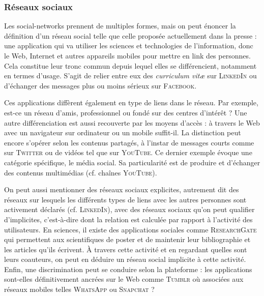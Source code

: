 \subsubsection[Réseaux sociaux]{Réseaux sociaux}
\label{subsub:II.1.1.2}

%
Les \glspl{social-network} prennent de multiples formes, mais on peut énoncer la définition d'un réseau social telle que celle proposée actuellement dans la presse : une application qui va utiliser les sciences et technologies de l'information, donc le Web, Internet et autres appareils mobiles pour mettre en \gls{link} des personnes. Cela constitue leur tronc commun depuis lequel elles se différencient, notamment en termes d'usage. 
S'agit de relier entre eux des \textit{curriculum vitæ} sur \textsc{LinkedIn} ou d'échanger des messages plus ou moins sérieux sur \textsc{Facebook}.

Ces applications diffèrent également en type de liens dans le réseau. Par exemple, est-ce un réseau d'amis, professionnel ou fondé sur des centres d'intérêt ? Une autre différenciation est aussi recouverte par les moyens d'accès : à travers le Web avec un navigateur sur ordinateur ou un mobile suffit-il. 
La distinction \nopagebreak peut encore s'opérer selon les contenus partagés, \pagebreak à l'instar de messages courts comme sur \textsc{Twitter} ou de vidéos tel que sur \textsc{YouTube}. Ce dernier exemple évoque une catégorie spécifique, le média social. Sa particularité est de produire et d'échanger des contenus multimédias (cf. chaînes \textsc{YouTube}).

%
On peut aussi mentionner des réseaux sociaux explicites, autrement dit des réseaux sur lesquels les différents types de liens avec les autres personnes sont activement déclarés (cf. \textsc{LinkedIn}), avec des réseaux sociaux qu'on peut qualifier d'implicites, c'est-à-dire dont la relation est calculée par rapport à l'activité des utilisateurs. 
En sciences, il existe des applications sociales comme \textsc{ResearchGate} qui permettent aux scientifiques de poster et de maintenir leur bibliographie et les articles qu'ils écrivent. À travers cette activité et en regardant quelles sont leurs coauteurs, on peut en déduire un réseau social implicite à cette activité. 
Enfin, une discrimination peut se conduire selon la plateforme : les applications sont-elles définitivement ancrées sur le Web comme \textsc{Tumblr} où associées aux réseaux mobiles telles \textsc{WhatsApp} ou \textsc{Snapchat} ?

